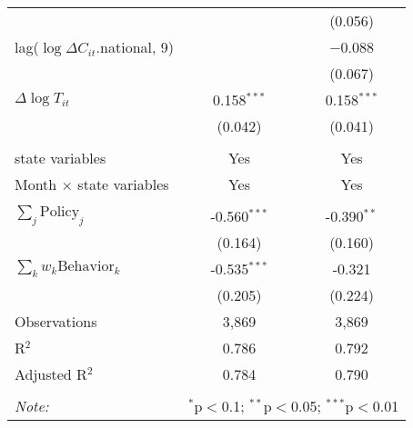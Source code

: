 \begin{tabular}{@{\extracolsep{1pt}}lcc}
  &  & (0.056) \\ 
  lag($\log \Delta C_{it}$.national, 9) &  & $-$0.088 \\ 
  &  & (0.067) \\ 
  $\Delta \log T_{it}$ & 0.158$^{***}$ & 0.158$^{***}$ \\ 
  & (0.042) & (0.041) \\ 
 \hline \\[-1.8ex] 
state variables & Yes & Yes \\ 
Month $\times$ state variables & Yes & Yes \\ 
\hline \\[-1.8ex] 
$\sum_j \mathrm{Policy}_j$ & -0.560$^{***}$ & -0.390$^{**}$ \\ 
 & (0.164) & (0.160) \\ 
$\sum_k w_k \mathrm{Behavior}_k$ & -0.535$^{***}$ & -0.321 \\ 
 & (0.205) & (0.224) \\ 
Observations & 3,869 & 3,869 \\ 
R$^{2}$ & 0.786 & 0.792 \\ 
Adjusted R$^{2}$ & 0.784 & 0.790 \\ 
\hline 
\hline \\[-1.8ex] 
\textit{Note:}  & \multicolumn{2}{r}{$^{*}$p$<$0.1; $^{**}$p$<$0.05; $^{***}$p$<$0.01} \\ 
\end{tabular} 
